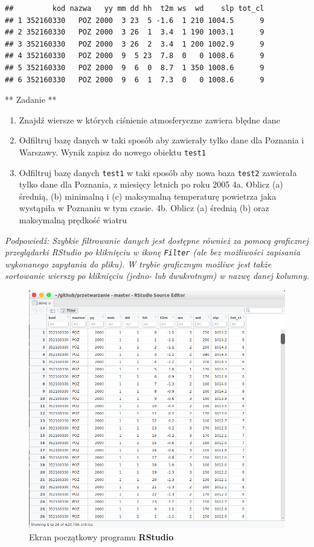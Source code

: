 \documentclass[]{book}
\providecommand{\tightlist}{%
  \setlength{\itemsep}{0pt}\setlength{\parskip}{0pt}}
\theoremstyle{definition}
\theoremstyle{definition}
\theoremstyle{definition}
\theoremstyle{remark}
\begin{document}
\begin{verbatim}
##         kod nazwa   yy mm dd hh  t2m ws  wd    slp tot_cl
## 1 352160330   POZ 2000  3 23  5 -1.6  1 210 1004.5      9
## 2 352160330   POZ 2000  3 26  1  3.4  1 190 1003.1      9
## 3 352160330   POZ 2000  3 26  2  3.4  1 200 1002.9      9
## 4 352160330   POZ 2000  9  5 23  7.8  0   0 1008.6      9
## 5 352160330   POZ 2000  9  6  0  8.7  1 350 1008.6      9
## 6 352160330   POZ 2000  9  6  1  7.3  0   0 1008.6      9
\end{verbatim}

** Zadanie **

\begin{enumerate}
\def\labelenumi{\arabic{enumi}.}
\tightlist
\item
  Znajdź wiersze w których ciśnienie atmosferyczne zawiera błędne dane
\item
  Odfiltruj bazę danych w taki sposób aby zawierały tylko dane dla
  Poznania i Warszawy. Wynik zapisz do nowego obiektu \texttt{test1}
\item
  Odfiltruj bazę danych \texttt{test1} w taki sposób aby nowa baza
  \texttt{test2} zawierała tylko dane dla Poznania, z miesięcy letnich
  po roku 2005 4a. Oblicz (a) średnią, (b) minimalną i (c) maksymalną
  temperaturę powietrza jaka wystąpiła w Poznaniu w tym czasie. 4b.
  Oblicz (a) średnią (b) oraz maksymalną prędkość wiatru
\end{enumerate}

\emph{Podpowiedź: Szybkie filtrowanie danych jest dostępne również za
pomocą graficznej przeglądarki RStudio po kliknięciu w ikonę
\texttt{Filter} (ale bez możliwości zapisania wykonanego zapytania do
pliku). W trybie graficznym możliwe jest także sortowanie wierszy po
kliknięciu (jedno- lub dwukrotnym) w nazwę danej kolumny.}

\begin{figure}
\centering
\includegraphics{figures/rstudio_filter.png}
\caption{Ekran początkowy programu \textbf{RStudio}}
\end{figure}
\end{document}
